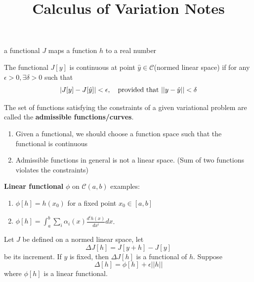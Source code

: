 \documentclass[12pt]{article}
\title{Calculus of Variation Notes}
\begin{document}
	\maketitle


\begin{definition}[Functional] \textnormal{a functional $J$ maps a function $h$ to a real number}
\end{definition}

\begin{definition}
\textnormal{The functional $J[y]$ is continuous at point $\hat{y} \in \mathcal{C}$(normed linear space) if for any $\epsilon > 0, \exists \delta > 0$ such that $$ |J[y] - J[\hat{y}]| < \epsilon, \quad \textnormal{provided that } ||y - \hat{y}|| < \delta $$ } 
\end{definition}

The set of functions satisfying the constraints of a given variational problem are called the \textbf{admissible functions/curves}.  
\begin{enumerate}
	\item Given a functional, we should choose a function space such that the functional is continuous
	\item Admissible functions in general is not a linear space. (Sum of two functions violates the constraints)
\end{enumerate}

\textbf{Linear functional} $\phi$ on $\mathcal{C}(a, b)$ examples:
\begin{enumerate}
	\item $\phi[h] = h(x_0)$ for a fixed point $x_0 \in [a,b]$
	\item $\phi[h] = \int_a^b \sum_i \alpha_i(x) \frac{d^i h(x)}{d x^i} dx$.
\end{enumerate}


\begin{definition}
	\textnormal{Let $J$ be defined on a normed linear space,  let $$\Delta J[h] = J[y + h] - J[y]$$ be its increment. If $y$ is fixed, then $\Delta J[h]$ is a functional of $h$. Suppose $$\Delta[h] = \phi[h] + \epsilon ||h||$$ where $\phi[h]$ is a linear functional.}
\end{definition}
\end{document}
